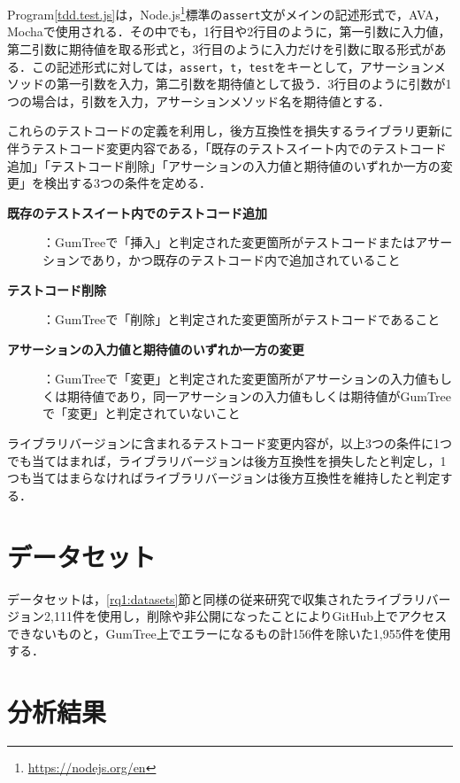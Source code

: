 \documentclass[submit]{ipsj}
\begin{document}
Program\ref{tdd.test.js}は，Node.js\footnote{\url{https://nodejs.org/en}}標準の{\verb|assert|}文がメインの記述形式で，AVA，Mochaで使用される．その中でも，1行目や2行目のように，第一引数に入力値，第二引数に期待値を取る形式と，3行目のように入力だけを引数に取る形式がある．この記述形式に対しては，{\verb|assert|}，{\verb|t|}，{\verb|test|}をキーとして，アサーションメソッドの第一引数を入力，第二引数を期待値として扱う．3行目のように引数が1つの場合は，引数を入力，アサーションメソッド名を期待値とする．

これらのテストコードの定義を利用し，後方互換性を損失するライブラリ更新に伴うテストコード変更内容である，「既存のテストスイート内でのテストコード追加」「テストコード削除」「アサーションの入力値と期待値のいずれか一方の変更」を検出する3つの条件を定める．

\begin{description}
  \item[\textbf{既存のテストスイート内でのテストコード追加}]：GumTreeで「挿入」と判定された変更箇所がテストコードまたはアサーションであり，かつ既存のテストコード内で追加されていること
  \item[\textbf{テストコード削除}]：GumTreeで「削除」と判定された変更箇所がテストコードであること
  \item[\textbf{アサーションの入力値と期待値のいずれか一方の変更}]：GumTreeで「変更」と判定された変更箇所がアサーションの入力値もしくは期待値であり，同一アサーションの入力値もしくは期待値がGumTreeで「変更」と判定されていないこと
\end{description}

ライブラリバージョンに含まれるテストコード変更内容が，以上3つの条件に1つでも当てはまれば，ライブラリバージョンは後方互換性を損失したと判定し，1つも当てはまらなければライブラリバージョンは後方互換性を維持したと判定する．

\section{データセット}
データセットは，\ref{rq1:datasets}節と同様の従来研究\cite{matsuda}で収集されたライブラリバージョン2,111件を使用し，削除や非公開になったことによりGitHub上でアクセスできないものと，GumTree上でエラーになるもの計156件を除いた1,955件を使用する．

\section{分析結果}
\end{document}
